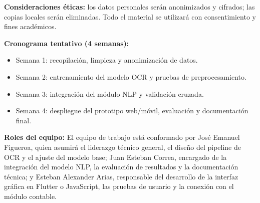 \documentclass[12pt,a4paper]{article}
\begin{document}
\textbf{Consideraciones éticas:} los datos personales serán anonimizados y cifrados; las copias locales serán eliminadas. Todo el material se utilizará con consentimiento y fines académicos.

\textbf{Cronograma tentativo (4 semanas):}
\begin{itemize}
    \item Semana 1: recopilación, limpieza y anonimización de datos.
    \item Semana 2: entrenamiento del modelo OCR y pruebas de preprocesamiento.
    \item Semana 3: integración del módulo NLP y validación cruzada.
    \item Semana 4: despliegue del prototipo web/móvil, evaluación y documentación final.
\end{itemize}

\textbf{Roles del equipo:}
El equipo de trabajo está conformado por José Emanuel Figueroa, quien asumirá el liderazgo técnico general, el diseño del pipeline de OCR y el ajuste del modelo base; Juan Esteban Correa, encargado de la integración del modelo NLP, la evaluación de resultados y la documentación técnica; y Esteban Alexander Arias, responsable del desarrollo de la interfaz gráfica en Flutter o JavaScript, las pruebas de usuario y la conexión con el módulo contable.
\cite{*}

\printbibliography[title={Referencias}]
\end{document}
